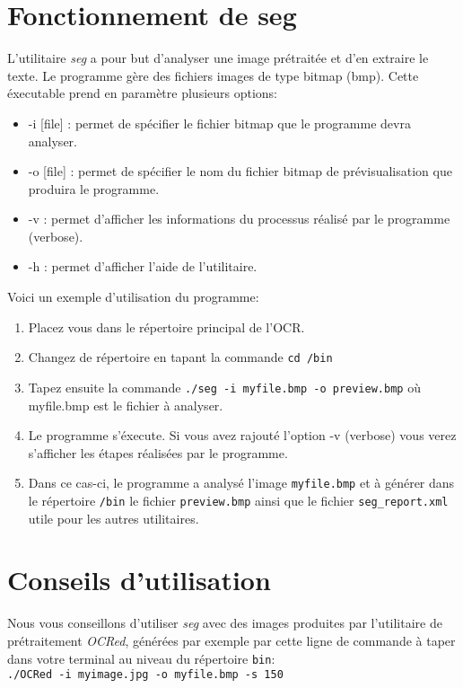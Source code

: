 \documentclass[a4paper,12pt]{report}
\begin{document}
\section{Fonctionnement de seg}
  L'utilitaire \emph{seg} a pour but d'analyser une image prétraitée et
  d'en extraire le texte. Le programme gère des fichiers images de type
  bitmap (bmp). Cette éxecutable prend en paramètre plusieurs options:
    \begin{itemize}
      \item -i [file] : permet de spécifier le fichier bitmap que le
            programme devra analyser.
      \item -o [file] : permet de spécifier le nom du fichier bitmap de
            prévisualisation que produira le programme.
      \item -v : permet d'afficher les informations du processus
            réalisé par le programme (verbose).
      \item -h : permet d'afficher l'aide de l'utilitaire.
    \end{itemize}
  
  Voici un exemple d'utilisation du programme:
    \begin{enumerate}
      \item Placez vous dans le répertoire principal de l'OCR.
      \item Changez de répertoire en tapant la commande
            \verb!cd /bin!
      \item Tapez ensuite la commande \verb!./seg -i myfile.bmp -o preview.bmp!
            où myfile.bmp est le fichier à analyser.
      \item Le programme s'éxecute. Si vous avez rajouté l'option -v
            (verbose) vous verez s'afficher les étapes réalisées par le
            programme.
      \item Dans ce cas-ci, le programme a analysé l'image \verb!myfile.bmp!
            et à générer dans le répertoire \verb!/bin! le fichier \verb!preview.bmp!
            ainsi que le fichier \verb!seg_report.xml! utile pour les autres
            utilitaires.
    \end{enumerate}

\section{Conseils d'utilisation}
  Nous vous conseillons d'utiliser \emph{seg} avec des images produites
par l'utilitaire de prétraitement \emph{OCRed}, générées par exemple par
cette ligne de commande à taper dans votre terminal au niveau du
répertoire \verb!bin!: \\ \verb!./OCRed -i myimage.jpg -o myfile.bmp -s 150!
\end{document}
